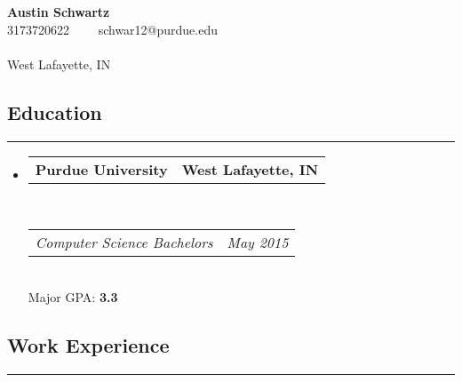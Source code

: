\documentclass[11pt,letterpaper]{article}
\makeatletter
\newcommand{\headerrow}[2]
{\begin{tabular*}{\linewidth}{l@{\extracolsep{\fill}}r}
    #1 &
    #2 \\
\end{tabular*}}
\makeatother
\begin{document}
\setlength{\parindent}{0cm}

\begin{center}
{\LARGE \textbf{ Austin Schwartz }}
\\
3173720622\ \ \textbullet
\ \ schwar12@purdue.edu
\\ 

\\
West Lafayette, IN
\\
\end{center}
\vspace{-2em}

\subsection*{Education}
\vspace{-0.4em}
\hrule

\begin{itemize}[label={},leftmargin=*]
\parskip=0.1em


\item
\headerrow 
{\textbf{ Purdue University }}
{\textbf{ West Lafayette, IN }}
\\
\headerrow
{\emph{ Computer Science Bachelors }}
{\emph{ May 2015 }}
\\
Major GPA: {\textbf{ 3.3 }}


\end{itemize}

\vspace{-1.5em}

\subsection*{Work Experience}
\vspace{-0.4em}
\hrule

\end{document}
